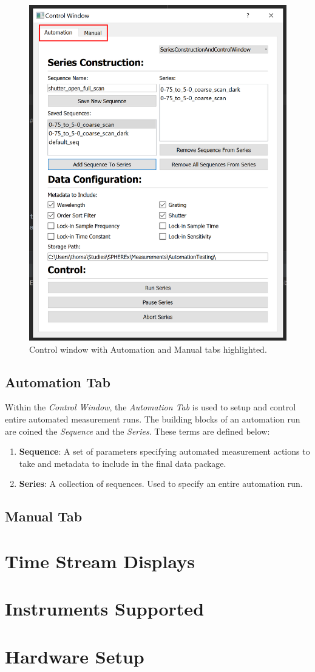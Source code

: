 \documentclass{article}
\begin{document}
\begin{figure}[H]
\label{Automation Window Tabs Highlighted}
\centering
\includegraphics[width=0.7\linewidth]{./images/AutomationWindow_TabsHighlighted.png}
\caption{Control window with Automation and Manual tabs highlighted.}
\end{figure}

\subsection{Automation Tab}

Within the \emph{Control Window}, the \emph{Automation Tab} is used to setup and control entire automated measurement runs. The building blocks of an automation run are coined the \emph{Sequence} and the \emph{Series}. These terms are defined below:

\begin{enumerate}
	\item \textbf{Sequence}: A set of parameters specifying automated measurement actions to take and metadata to include in the final data package.
	\item \textbf{Series}: A collection of sequences. Used to specify an entire automation run.
\end{enumerate}

\subsection{Manual Tab}

\section{Time Stream Displays}
	
\section{Instruments Supported}
	
\appendix
\section{Hardware Setup} \label{HW Setup Appendix}	
	
\end{document}
